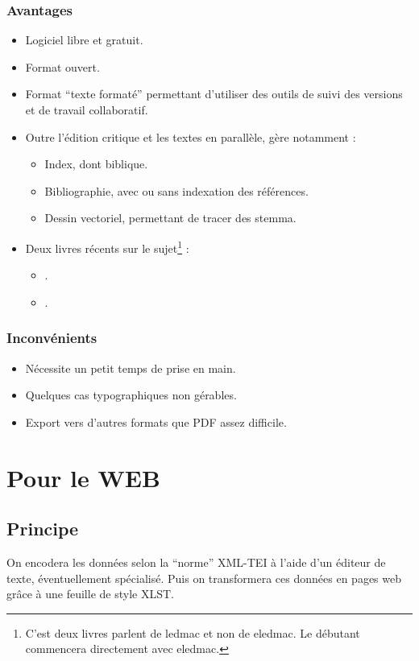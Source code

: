 \documentclass{article}
\begin{document}
\subsubsection{Avantages}
\begin{itemize}
	\item Logiciel libre et gratuit.
	\item Format ouvert.
	\item Format \enquote{texte formaté} permettant d'utiliser des outils de suivi des versions et de travail collaboratif.
	\item Outre l'édition critique et les textes en parallèle, gère notamment :
		\begin{itemize}
			\item Index, dont biblique.
			\item Bibliographie, avec ou sans indexation des références.
			\item Dessin vectoriel, permettant de tracer des stemma.
		\end{itemize}
	\item Deux livres récents sur le sujet\footnote{C'est deux livres parlent de ledmac et non de eledmac. Le débutant commencera directement avec eledmac.} :
		\begin{itemize}
		\item \cite[disponible également en libre téléchargement]{Rouquette2012}.
		\item \cite{leal2012}.
		\end{itemize}
\end{itemize}

\subsubsection{Inconvénients}
	\begin{itemize}
		\item Nécessite un petit temps de prise en main.
		\item Quelques cas typographiques non gérables.
		\item Export vers d'autres formats que PDF assez difficile.
	\end{itemize}
\section{Pour le WEB}
\subsection{Principe}
On encodera les données selon la \enquote{norme} XML-TEI à l'aide d'un éditeur de texte, éventuellement spécialisé. Puis on transformera ces données en pages web grâce à une feuille de style XLST.
\end{document}
